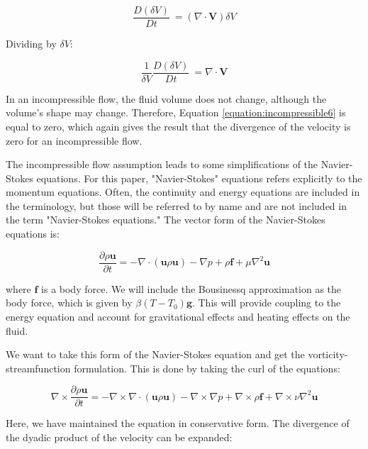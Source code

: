 \documentclass[journal]{new-aiaa}
\begin{document}
\begin{equation}
\label{equation:incompressible5}
\frac{D(\delta V)}{Dt} \  = (\nabla \cdot \textbf{V})\delta V
\end{equation}

Dividing by $\delta V$:

\begin{equation}
\label{equation:incompressible6}
\frac{1}{\delta V}\frac{D(\delta V)}{Dt} \  = \nabla \cdot \textbf{V}
\end{equation}

In an incompressible flow, the fluid volume does not change, although the volume's shape may change. Therefore, Equation \ref{equation:incompressible6} is equal to zero, which again gives the result that the divergence of the velocity is zero for an incompressible flow.

The incompressible flow assumption leads to some simplifications of the Navier-Stokes equations. For this paper, "Navier-Stokes" equations refers explicitly to the momentum equations. Often, the continuity and energy equations are included in the terminology, but those will be referred to by name and are not included in the term "Navier-Stokes equations." The vector form of the Navier-Stokes equations is:

\begin{equation}
\label{equation:nsvec}
\frac{\partial \rho \textbf{u}}{\partial t} =-\nabla \cdot (\textbf{u}\rho \textbf{u})-\nabla p+\rho \textbf{f} + \mu \nabla^2 \textbf{u}
\end{equation}

where $\textbf{f}$ is a body force. We will include the Bousinessq approximation as the body force, which is given by $\beta(T-T_0)\textbf{g}$. This will provide coupling to the energy equation and account for gravitational effects and heating effects on the fluid.

We want to take this form of the Navier-Stokes equation and get the vorticity-streamfunction formulation. This is done by taking the curl of the equations:

\begin{equation}
\label{equation:nscurl}
\nabla \times \frac{\partial \rho \textbf{u}}{\partial t} =-\nabla \times \nabla \cdot (\textbf{u}\rho \textbf{u})-\nabla \times \nabla p+\nabla \times \rho \textbf{f}+ \nabla \times \nu \nabla^2 \textbf{u}
\end{equation}

Here, we have maintained the equation in conservative form. The divergence of the dyadic product of the velocity can be expanded:
\end{document}

